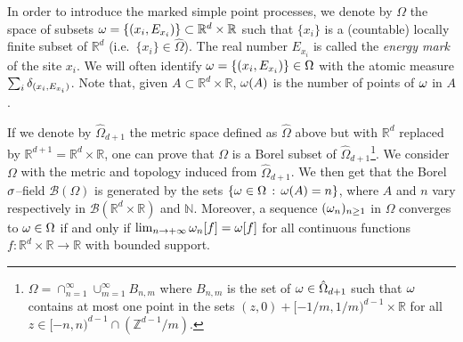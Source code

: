 \documentclass[12pt,a4paper,reqno]{amsart}
\newcommand{\cB}{\ensuremath{\mathcal B}}
\newcommand{\bbN}{{\ensuremath{\mathbb N}} }
\newcommand{\bbR}{{\ensuremath{\mathbb R}} }
\newcommand{\bbZ}{{\ensuremath{\mathbb Z}} }
\let\O=\Omega \let\P=\Pi   \let\Ps=\Psi \let\Si=\Sigma \let\X=\Xi
\newcommand{\rosso}{\textcolor{black}} %
\begin{document}
 
\medskip
In order to introduce the marked simple point processes,  
 we denote by $\O$ the space of subsets $\o=\{ (x_i, E_{x_i}) \}\subset\bbR^d\times \bbR$ such 
 that $\{x_i\}$ is a (countable) locally finite subset of $\bbR^d$ (i.e.~$\{x_i\}\in \hat \O$).
  The real number $E_{x_i}$ is called the \emph{energy mark} of the site $x_i$.
We will often  identify $\o=\{ (x_i, E_{x_i}) \} \in \O$ with the atomic measure $\sum_i \delta_{(x_i,E_{x_i})}$. Note that, given  $A\subset \bbR^d\times \bbR$,   $\omega(A)$  is the number of points of $\omega$ in $A$.


If we denote by $\hat \O_{d+1}$ the metric space defined as $\hat \O$ above but with $\bbR^d$
replaced by $\bbR^{d+1}=\bbR^d\times\bbR$, one can prove that $\O$ is a Borel subset of $\hat \O_{d+1}$\footnote{$\O=\cap_{n=1}^\infty \cup_{m=1}^\infty B_{n,m}$ where $B_{n,m}$ is the set of 
 $\o \in \hat \O_{d+1}$ such   that $\omega$ contains at most one point in the sets $(z,0) + [-1/m,1/m)^{d-1}\times \bbR$ for all $z\in [-n,n)^{d-1}\cap (\bbZ^{d-1}/m)$.}.
We consider $\O$ with the metric and topology induced from $\hat \O_{d+1}$. We  then get that  the Borel $\sigma$--field  $\cB(\O)$  is generated by the sets $\{ \o\in \O\,:\, \o(A)=n\}$, where    $A$ and $n$ vary respectively in $\cB( \bbR^d\times \bbR) $  and $\bbN$. Moreover,  a  sequence $(\omega_n)_{n\geq 1}$ in $\O$ converges to $ \o\in \O$ if and only if $\lim_{n\to +\infty} \omega_n[f]= \omega[f]$ for all   continuous  functions $f: \bbR^d\times \bbR \to \bbR$ with bounded support.

%  
\end{document}
